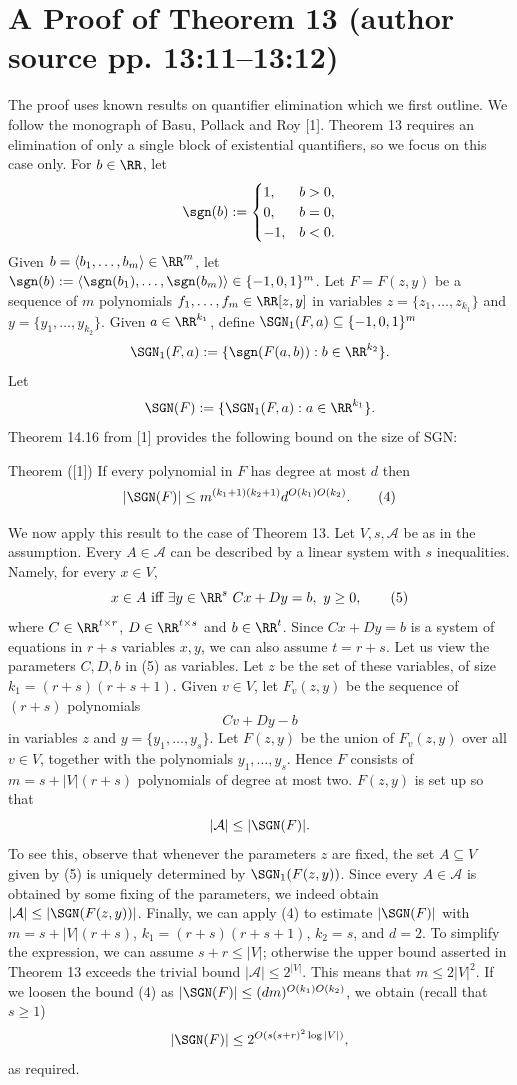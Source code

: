 \section*{A Proof of Theorem 13 (author source pp. 13:11--13:12)}
The proof uses known results on quantifier elimination which we first outline. We follow the monograph of Basu, Pollack and Roy [1]. Theorem 13 requires an elimination of only a single block of existential quantifiers, so we focus on this case only.
For $b\in\RR$, let
\[\sgn(b):=\begin{cases}1,&b>0,\\0,&b=0,\\-1,&b<0.\end{cases}\]
Given $b=\langle b_1,\ldots,b_m\rangle\in\RR^m$, let $\sgn(b):=\langle\sgn(b_1),\ldots,\sgn(b_m)\rangle\in\{-1,0,1\}^m$. Let $F=F(z,y)$ be a sequence of $m$ polynomials $f_1,\ldots,f_m\in\RR[z,y]$ in variables $z=\{z_1,\ldots,z_{k_1}\}$ and $y=\{y_1,\ldots,y_{k_2}\}$. Given $a\in\RR^{k_1}$, define $\SGN_1(F,a)\subseteq\{-1,0,1\}^m$
\[\SGN_1(F,a):=\{\sgn(F(a,b)):b\in\RR^{k_2}\}.\]
Let
\[\SGN(F):=\{\SGN_1(F,a):a\in\RR^{k_1}\}.\]
Theorem 14.16 from [1] provides the following bound on the size of SGN:
\begin{originalresult}{Theorem ([1])}
If every polynomial in $F$ has degree at most $d$ then
\[|\SGN(F)|\le m^{(k_1+1)(k_2+1)}d^{O(k_1)O(k_2)}.\tag{4}\]
\end{originalresult}
We now apply this result to the case of Theorem 13. Let $V,s,\mathcal A$ be as in the assumption. Every $A\in\mathcal A$ can be described by a linear system with $s$ inequalities. Namely, for every $x\in V$,
\[x\in A\text{ iff }\exists y\in\RR^s\ Cx+Dy=b,\ y\ge0,\tag{5}\]
where $C\in\RR^{t\times r}$, $D\in\RR^{t\times s}$ and $b\in\RR^t$. Since $Cx+Dy=b$ is a system of equations in $r+s$ variables $x,y$, we can also assume $t=r+s$.
Let us view the parameters $C,D,b$ in (5) as variables. Let $z$ be the set of these variables, of size $k_1=(r+s)(r+s+1)$. Given $v\in V$, let $F_v(z,y)$ be the sequence of $(r+s)$ polynomials
\[Cv+Dy-b\]
in variables $z$ and $y=\{y_1,\ldots,y_s\}$. Let $F(z,y)$ be the union of $F_v(z,y)$ over all $v\in V$, together with the polynomials $y_1,\ldots,y_s$. Hence $F$ consists of $m=s+|V|(r+s)$ polynomials of degree at most two.
$F(z,y)$ is set up so that
\[|\mathcal A|\le|\SGN(F)|.\]
To see this, observe that whenever the parameters $z$ are fixed, the set $A\subseteq V$ given by (5) is uniquely determined by $\SGN_1(F(z,y))$. Since every $A\in\mathcal A$ is obtained by some fixing of the parameters, we indeed obtain $|\mathcal A|\le|\SGN(F(z,y))|$.
Finally, we can apply (4) to estimate $|\SGN(F)|$ with $m=s+|V|(r+s)$, $k_1=(r+s)(r+s+1)$, $k_2=s$, and $d=2$. To simplify the expression, we can assume $s+r\le|V|$; otherwise the upper bound asserted in Theorem 13 exceeds the trivial bound $|\mathcal A|\le2^{|V|}$. This means that $m\le2|V|^2$. If we loosen the bound (4) as $|\SGN(F)|\le(dm)^{O(k_1)O(k_2)}$, we obtain (recall that $s\ge1$)
\[|\SGN(F)|\le2^{O(s(s+r)^2\log|V|)},\]
as required.
